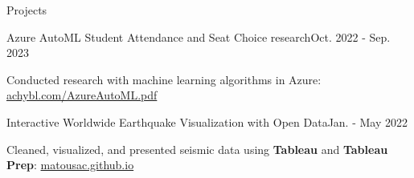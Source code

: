 \begin{rSection}{Projects}
  \begin{project}{Azure AutoML Student Attendance and Seat Choice research}{Oct. 2022 - Sep. 2023}
    \item Conducted research with machine learning algorithms in Azure: \href{https://achybl.com/AzureAutoML.pdf}{achybl.com/AzureAutoML.pdf}
  \end{project}
  \begin{project}{Interactive Worldwide Earthquake Visualization with Open Data}{Jan. - May 2022}
    \item Cleaned, visualized, and presented seismic data using {\bf Tableau} and {\bf Tableau Prep}: \href{https://matousac.github.io/}{matousac.github.io}
  \end{project}
\end{rSection}
